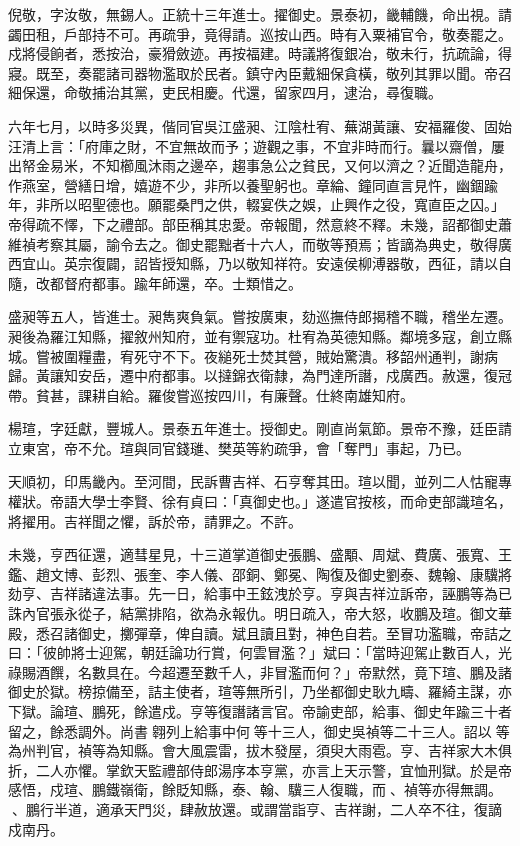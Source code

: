 \begin{pinyinscope}
倪敬，字汝敬，無錫人。正統十三年進士。擢御史。景泰初，畿輔饑，命出視。請蠲田租，戶部持不可。再疏爭，竟得請。巡按山西。時有入粟補官令，敬奏罷之。戍將侵餉者，悉按治，豪猾斂迹。再按福建。時議將復銀冶，敬未行，抗疏論，得寢。既至，奏罷諸司器物濫取於民者。鎮守內臣戴細保貪橫，敬列其罪以聞。帝召細保還，命敬捕治其黨，吏民相慶。代還，留家四月，逮治，尋復職。

六年七月，以時多災異，偕同官吳江盛昶、江陰杜宥、蕪湖黃讓、安福羅俊、固始汪清上言：「府庫之財，不宜無故而予；遊觀之事，不宜非時而行。曩以齋僧，屢出帑金易米，不知櫛風沐雨之邊卒，趨事急公之貧民，又何以濟之？近聞造龍舟，作燕室，營繕日增，嬉遊不少，非所以養聖躬也。章綸、鐘同直言見忤，幽錮踰年，非所以昭聖德也。願罷桑門之供，輟宴佚之娛，止興作之役，寬直臣之囚。」帝得疏不懌，下之禮部。部臣稱其忠愛。帝報聞，然意終不釋。未幾，詔都御史蕭維禎考察其屬，諭令去之。御史罷黜者十六人，而敬等預焉；皆謫為典史，敬得廣西宜山。英宗復闢，詔皆授知縣，乃以敬知祥符。安遠侯柳溥器敬，西征，請以自隨，改都督府都事。踰年師還，卒。士類惜之。

盛昶等五人，皆進士。昶雋爽負氣。嘗按廣東，劾巡撫侍郎揭稽不職，稽坐左遷。昶後為羅江知縣，擢敘州知府，並有禦寇功。杜宥為英德知縣。鄰境多寇，創立縣城。嘗被圍糧盡，宥死守不下。夜縋死士焚其營，賊始驚潰。移韶州通判，謝病歸。黃讓知安岳，遷中府都事。以撻錦衣衛隸，為門達所譖，戍廣西。赦還，復冠帶。貧甚，課耕自給。羅俊嘗巡按四川，有廉聲。仕終南雄知府。

楊瑄，字廷獻，豐城人。景泰五年進士。授御史。剛直尚氣節。景帝不豫，廷臣請立東宮，帝不允。瑄與同官錢璡、樊英等約疏爭，會「奪門」事起，乃已。

天順初，印馬畿內。至河間，民訴曹吉祥、石亨奪其田。瑄以聞，並列二人怙寵專權狀。帝語大學士李賢、徐有貞曰：「真御史也。」遂遣官按核，而命吏部識瑄名，將擢用。吉祥聞之懼，訴於帝，請罪之。不許。

未幾，亨西征還，適彗星見，十三道掌道御史張鵬、盛顒、周斌、費廣、張寬、王鑑、趙文博、彭烈、張奎、李人儀、邵銅、鄭冕、陶復及御史劉泰、魏翰、康驥將劾亨、吉祥諸違法事。先一日，給事中王鉉洩於亨。亨與吉祥泣訴帝，誣鵬等為已誅內官張永從子，結黨排陷，欲為永報仇。明日疏入，帝大怒，收鵬及瑄。御文華殿，悉召諸御史，擲彈章，俾自讀。斌且讀且對，神色自若。至冒功濫職，帝詰之曰：「彼帥將士迎駕，朝廷論功行賞，何雲冒濫？」斌曰：「當時迎駕止數百人，光祿賜酒饌，名數具在。今超遷至數千人，非冒濫而何？」帝默然，竟下瑄、鵬及諸御史於獄。榜掠備至，詰主使者，瑄等無所引，乃坐都御史耿九疇、羅綺主謀，亦下獄。論瑄、鵬死，餘遣戍。亨等復譖諸言官。帝諭吏部，給事、御史年踰三十者留之，餘悉調外。尚書翱列上給事中何等十三人，御史吳禎等二十三人。詔以等為州判官，禎等為知縣。會大風震雷，拔木發屋，須臾大雨雹。亨、吉祥家大木俱折，二人亦懼。掌欽天監禮部侍郎湯序本亨黨，亦言上天示警，宜恤刑獄。於是帝感悟，戍瑄、鵬鐵嶺衛，餘貶知縣，泰、翰、驥三人復職，而、禎等亦得無調。、鵬行半道，適承天門災，肆赦放還。或謂當詣亨、吉祥謝，二人卒不往，復謫戍南丹。


\end{pinyinscope}
